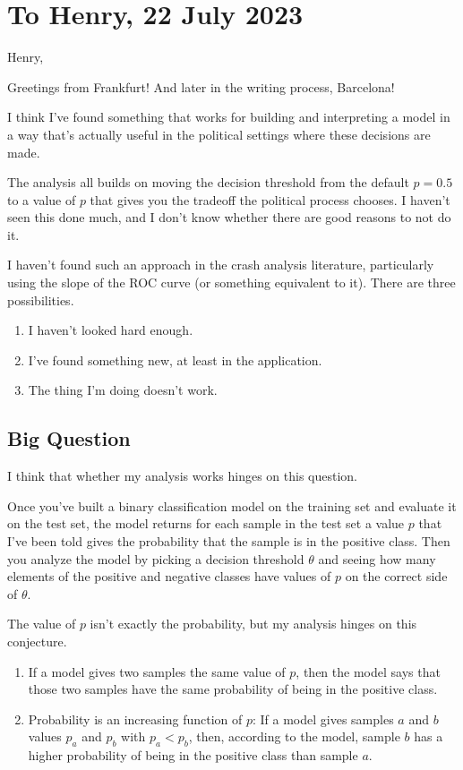 \section{To Henry, 22 July 2023}

Henry, 

Greetings from Frankfurt!  And later in the writing process, Barcelona!

I think I've found something that works for building and interpreting a model in a way that's actually useful in the political settings where these decisions are made.  

The analysis all builds on moving the decision threshold from the default $p=0.5$ to a value of $p$ that gives you the tradeoff the political process chooses.  I haven't seen this done much, and I don't know whether there are good reasons to not do it.  

I haven't found such an approach in the crash analysis literature, particularly using the slope of the ROC curve (or something equivalent to it).  There are three possibilities.  

\begin{enumerate}
	\item I haven't looked hard enough.
	\item I've found something new, at least in the application.
	\item The thing I'm doing doesn't work.  
\end{enumerate}

\subsection{Big Question}

I think that whether my analysis works hinges on this question.  

Once you've built a binary classification model on the training set and evaluate it on the test set, the model returns for each sample in the test set a value $p$ that I've been told gives the probability that the sample is in the positive class.  Then you analyze the model by picking a decision threshold $\theta$ and seeing how many elements of the positive and negative classes have values of $p$ on the correct side of $\theta$.  

The value of $p$ isn't exactly the probability, but my analysis hinges on this conjecture.  

\begin{enumerate}
	\item If a model gives two samples the same value of $p$, then the model says that those two samples have the same probability of being in the positive class.  
	\item  Probability is an increasing function of $p$:  If a model gives samples $a$ and $b$ values $p_a$ and $p_b$ with $p_a < p_b$, then, according to the model, sample $b$ has a higher probability of being in the positive class than sample $a$.  
\end{enumerate}

